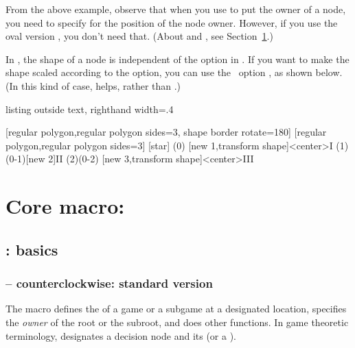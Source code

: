 \remark
From the above example, observe that when you use \cmd{\istroot} to put the owner of a node, you need to specify  for the position of the node owner.
However, if you use the oval version \cmd{\istrooto}, you don't need that.
(About \cmd{\istroot} and \cmd{\istrooto}, see Section~\ref{sec:istroot}.)

\remark
In \TikZ, the shape of a node is independent of the  option in .
If you want to make the shape scaled according to the  option, you can use the \TikZ\ option , as shown below. (In this kind of case, \cmd{\istrooto} helps, rather than \cmd{\istroot}.)

\begin{tcblisting}{listing outside text, righthand width=.4\linewidth}
\begin{istgame}[scale=1.5]
  [regular polygon,regular polygon sides=3,
   shape border rotate=180]
  [regular polygon,regular polygon sides=3]
[star]
\xtdistance{15mm}{30mm}
\istroot(0)
  [new 1,transform shape]<center>{I}
  \istb  \istb  \endist
\xtdistance{15mm}{15mm}
\istrooto(1)(0-1)[new 2]{II} %
  \istb  \istb  \endist
\istroot(2)(0-2)
  [new 3,transform shape]<center>{III}
  \istb  \istb  \endist
\end{istgame}
\end{tcblisting}


\section{Core macro: \protect\cmd{\istroot}}
\label{sec:istroot}

\subsection{\protect\cmd{\istroot}: basics}

\subsubsection{\protect\cmd{\istroot} -- counterclockwise: standard version}
\label{ssec:istroot}

The macro \icmd{\istroot} defines the \emph{} of a game or a subgame at a designated location, specifies the \emph{owner} of the root or the subroot, and does other functions.
In game theoretic terminology, \cmd{\istroot} designates a decision node and its  (or a ).

